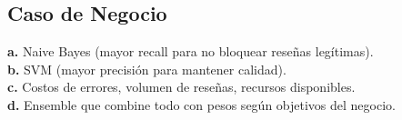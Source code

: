 \documentclass[12pt]{article}
\begin{document}
\subsection{Caso de Negocio}

\textbf{a.} Naive Bayes (mayor recall para no bloquear reseñas legítimas). \\
\textbf{b.} SVM (mayor precisión para mantener calidad). \\
\textbf{c.} Costos de errores, volumen de reseñas, recursos disponibles. \\
\textbf{d.} Ensemble que combine todo con pesos según objetivos del negocio.
\end{document}

